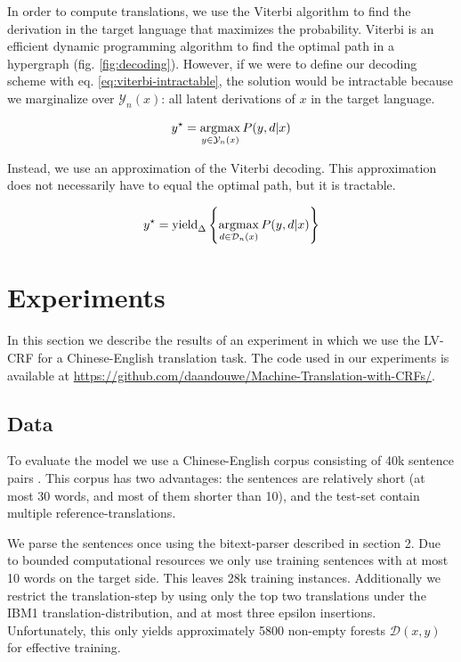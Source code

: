 \documentclass[11pt,a4paper]{article}
\begin{document}
In order to compute translations, we use the Viterbi algorithm to find the derivation in the target language that maximizes the probability. Viterbi is an efficient dynamic programming algorithm to find the optimal path in a hypergraph (fig. \ref{fig:decoding}). However, if we were to define our decoding scheme with eq. \ref{eq:viterbi-intractable}, the solution would be intractable because we marginalize over $\mathcal{Y}_n(x)$: all latent derivations of $x$ in the target language.

\begin{equation}
    \label{eq:viterbi-intractable}
    y^\star = \operatornamewithlimits{arg max}_{y \in \mathcal{Y}_n(x)} P(y, d | x)
\end{equation}

Instead, we use an approximation of the Viterbi decoding. This approximation does not necessarily have to equal the optimal path, but it is tractable.

\begin{equation}
    y^\star = \textrm{yield}_\Delta \left\{ \operatornamewithlimits{arg max}_{d \in \mathcal{D}_n(x)} P(y, d | x) \right\}
\end{equation}

\section{Experiments}

In this section we describe the results of an experiment in which we use the LV-CRF for a Chinese-English translation task. The code used in our experiments is available at \url{https://github.com/daandouwe/Machine-Translation-with-CRFs/}.

\subsection{Data}

To evaluate the model we use a Chinese-English corpus consisting of 40k sentence pairs \cite{takezawa2002}. This corpus has two advantages: the sentences are relatively short (at most 30 words, and most of them shorter than 10), and the test-set contain multiple reference-translations. 

We parse the sentences once using the bitext-parser described in section 2. Due to bounded computational resources we only use training sentences with at most 10 words on the target side. This leaves 28k training instances. Additionally we restrict the translation-step by using only the top two translations under the IBM1 translation-distribution, and at most three epsilon insertions. Unfortunately, this only yields approximately 5800 non-empty forests $\mathcal{D}(x,y)$ for effective training.
\end{document}
